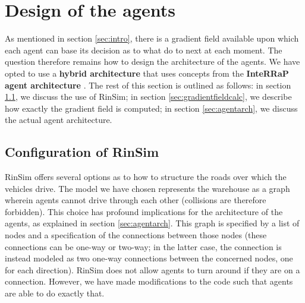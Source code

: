 \section{Design of the agents}\label{sec:agentdesign}
As mentioned in section \ref{sec:intro}, there is a gradient field available upon which each agent can base its decision as to what do to next at each moment. The question therefore remains how to design the architecture of the agents. We have opted to use a \textbf{hybrid architecture} that uses concepts from the \textbf{InteRRaP agent architecture} \cite{muller2011agent}. The rest of this section is outlined as follows: in section \ref{sec:rinsimconf}, we discuss the use of RinSim; in section \ref{sec:gradientfieldcalc}, we describe how exactly the gradient field is computed; in section \ref{sec:agentarch}, we discuss the actual agent architecture.

\subsection{Configuration of RinSim}\label{sec:rinsimconf}
RinSim \cite{rinsim} offers several options as to how to structure the roads over which the vehicles drive. The model we have chosen represents the warehouse as a graph wherein agents cannot drive through each other (collisions are therefore forbidden). This choice has profound implications for the architecture of the agents, as explained in section \ref{sec:agentarch}. This graph is specified by a list of nodes and a specification of the connections between those nodes (these connections can be one-way or two-way; in the latter case, the connection is instead modeled as two one-way connections between the concerned nodes, one for each direction). RinSim does not allow agents to turn around if they are on a connection. However, we have made modifications to the code such that agents are able to do exactly that.

